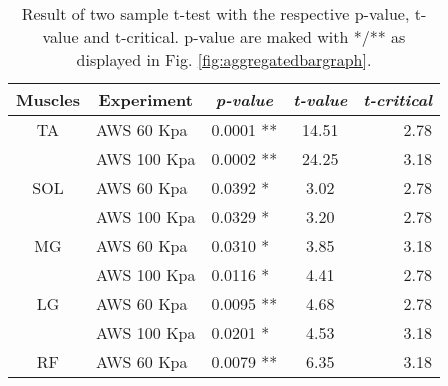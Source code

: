 \documentclass[letterpaper, 10 pt, conference]{ieeeconf}  %
\begin{document}
\begin{table}[]
	\centering
	\caption{Result of two sample t-test with the respective p-value, t-value and t-critical. p-value are maked with */** as displayed in Fig. \ref{fig:aggregatedbargraph}.}
	\label{my-label}
	\begin{tabular}{@{}cllcr@{}}
		\toprule
		\textbf{Muscles} & \multicolumn{1}{c}{\textbf{Experiment}} & \multicolumn{1}{c}{\textit{\textbf{p-value}}} & \textit{\textbf{t-value}} & \multicolumn{1}{c}{\textit{\textbf{t-critical}}} \\ \midrule
		TA               & AWS 60 Kpa                              & 0.0001 **                                     & 14.51                     & 2.78                                             \\
		& AWS 100 Kpa                             & 0.0002 **                                     & 24.25                     & 3.18                                             \\
		SOL              & AWS 60 Kpa                              & 0.0392 *                                      & 3.02                      & 2.78                                             \\
		& AWS 100 Kpa                             & 0.0329 *                                      & 3.20                      & 2.78                                             \\
		MG               & AWS 60 Kpa                              & 0.0310 *                                      & 3.85                      & 3.18                                             \\
		& AWS 100 Kpa                             & 0.0116 *                                      & 4.41                      & 2.78                                             \\
		LG               & AWS 60 Kpa                              & 0.0095 **                                     & 4.68                      & 2.78                                             \\
		& AWS 100 Kpa                             & 0.0201 *                                      & 4.53                      & 3.18                                             \\
		RF               & AWS 60 Kpa                              & 0.0079 **                                     & 6.35                      & 3.18                                             \\

\end{tabular}
\end{table}
\end{document}
